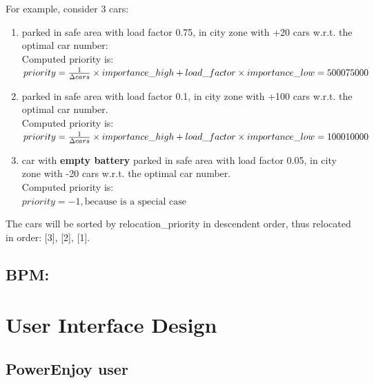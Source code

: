 \documentclass[english]{article}
\newcommand{\code}[2]{
  \hrulefill
  \subsection*{#1}
  
  \vspace{2em}
}
\begin{document}
		For example, consider 3 cars:
		\begin{enumerate}
			\item{ parked in safe area with load factor 0.75, in city zone with +20 cars w.r.t. the optimal car number: \\
			Computed priority is:\\
			 $
			 priority = {1 \over \Delta cars} \times importance\_high + load\_factor \times importance\_low = 500075000
			 $}
			\item{ parked in safe area with load factor 0.1, in city zone with +100 cars w.r.t. the optimal car number.\\
			Computed priority is:\\
			 $
			 priority = {1 \over \Delta cars} \times importance\_high + load\_factor \times importance\_low = 100010000
			 $ }
			\item{ car with \textbf{empty battery} parked in safe area with load factor 0.05, in city zone with -20 cars w.r.t. the optimal car number.\\
			Computed priority is:\\
			 $
			 priority = -1,  \text{because is a special case}
			 $}
		\end{enumerate}
		The cars will be sorted by relocation\_priority in descendent order, thus relocated in order: [3], [2], [1].\\   
		\code{BPM: }{./Algorithm/bpm.py}
\section{User Interface Design}%
		\subsection{PowerEnjoy user}
\end{document}
